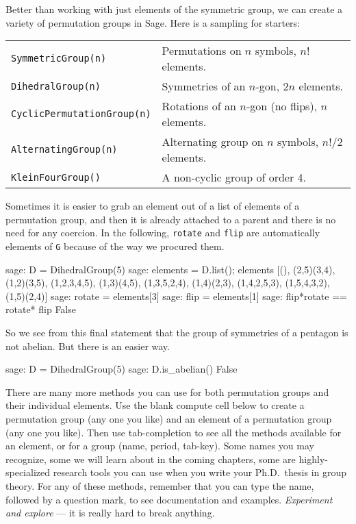 %
Better than working with just elements of the symmetric group, we can create a variety of permutation groups in Sage.  Here is a sampling for starters:
%
\begin{center}
\begin{tabular}{ll}
\verb?SymmetricGroup(n)?         & Permutations on $n$ symbols, $n!$ elements.\\
\verb?DihedralGroup(n)?          & Symmetries of an $n$-gon, $2n$ elements.\\
\verb?CyclicPermutationGroup(n)? & Rotations of an $n$-gon (no flips), $n$ elements.\\
\verb?AlternatingGroup(n)?       & Alternating group on $n$ symbols, $n!/2$ elements.\\
\verb?KleinFourGroup()?          & A non-cyclic group of order 4.
\end{tabular}
\end{center}
%
%
Sometimes it is easier to grab an element out of a list of elements of a permutation group, and then it is already attached to a parent and there is no need for any coercion.  In the following, \verb?rotate? and \verb?flip? are automatically elements of \verb?G? because of the way we procured them.
%
\begin{sageexample}
sage: D = DihedralGroup(5)
sage: elements = D.list(); elements
[(), (2,5)(3,4), (1,2)(3,5), (1,2,3,4,5), (1,3)(4,5),
(1,3,5,2,4), (1,4)(2,3), (1,4,2,5,3), (1,5,4,3,2), (1,5)(2,4)]
sage: rotate = elements[3]
sage: flip = elements[1]
sage: flip*rotate == rotate* flip
False
\end{sageexample}
%
So we see from this final statement that the group of symmetries of a pentagon is not abelian.  But there is an easier way.
%
\begin{sageexample}
sage: D = DihedralGroup(5)
sage: D.is_abelian()
False
\end{sageexample}
%
There are many more methods you can use for both permutation groups and their individual elements.  Use the blank compute cell below to create a permutation group (any one you like) and an element of a permutation group (any one you like).  Then use tab-completion to see all the methods available for an element, or for a group (name, period, tab-key).  Some names you may recognize, some we will learn about in the coming chapters, some are highly-specialized research tools you can use when you write your Ph.D.\ thesis in group theory.  For any of these methods, remember that you can type the name, followed by a question mark, to see documentation and examples.  \emph{Experiment and explore} --- it is really hard to break anything.\par
